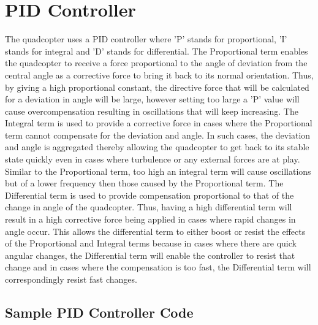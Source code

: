 
\chapter{PID Controller}
The quadcopter uses a PID controller where 'P' stands for proportional, 'I' stands for integral and 'D' stands for differential. 
\newline
\newline
The Proportional term enables the quadcopter to receive a force proportional to the angle of deviation from the central angle as a corrective force to bring it back to its normal orientation. Thus, by giving a high proportional constant, the directive force that will be calculated for a deviation in angle will be large, however setting too large a 'P' value will cause overcompensation resulting in oscillations that will keep increasing.
\newline
\newline
The Integral term is used to provide a corrective force in cases where the Proportional term cannot compensate for the deviation and angle. In such cases, the deviation and angle is aggregated thereby allowing the quadcopter to get back to its stable state quickly even in cases where turbulence or any external forces are at play. Similar to the Proportional term, too high an integral term  will cause oscillations but of a lower frequency then those caused by the Proportional term.
\newline
\newline
The Differential term  is used to provide compensation proportional to that of the change in angle of the quadcopter. Thus, having a high differential term will result in a high corrective force being applied in cases where rapid changes in angle occur. This allows the differential term  to either boost or resist the effects of the Proportional and Integral terms because in cases where there are quick angular changes, the Differential term will enable the controller to resist that change and in cases where the compensation is too fast, the Differential term will correspondingly resist fast changes.
\section{Sample PID Controller Code}
   
